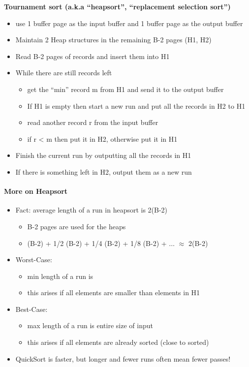 \textbf{Tournament sort (a.k.a ``heapsort'',
  ``replacement selection sort'')}
\begin{itemize}
\item use 1 buffer page as the input buffer and 1 buffer page as
  the output buffer
\item Maintain 2 Heap structures in the remaining B-2 pages
  (H1, H2)
\item Read B-2 pages of records and insert them into H1
\item While there are still records left
  \begin{itemize}
  \item get the ``min'' record m from H1 and send it to the output
    buffer
  \item If H1 is empty then start a new run and put all the records
    in H2 to H1
  \item read another record r from the input buffer
  \item if r < m then put it in H2, otherwise put it in H1
  \end{itemize}
\item Finish the current run by outputting all the records in H1
\item If there is something left in H2, output them as a new run
\end{itemize}

\paragraph{More on Heapsort}
\begin{itemize}
\item Fact: average length of a run in heapsort is 2(B-2)
  \begin{itemize}
  \item B-2 pages are used for the heaps
  \item (B-2) + 1/2 (B-2) + 1/4 (B-2) + 1/8 (B-2) + $\ldots$
    $\approx$ 2(B-2)
  \end{itemize}
\item Worst-Case:
  \begin{itemize}
  \item min length of a run is
  \item this arises if all elements are smaller than elements in H1
  \end{itemize}
\item Best-Case:
  \begin{itemize}
  \item max length of a run is entire size of input
  \item this arises if all elements are already sorted (close to sorted)
  \end{itemize}
\item QuickSort is faster, but longer and fewer runs often mean
  fewer passes!
\end{itemize}

